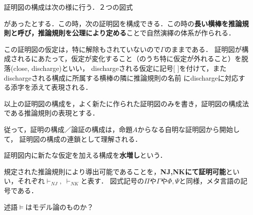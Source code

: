 \documentclass[uplatex, 12pt, dvipdfmx]{jsreport}
\begin{document}
\begin{definition}[証明図の構成（合成）]
    証明図の構成は次の様に行う．２つの図式
        \begin{center}
        \end{center}
        があったとする．この時，次の証明図を構成できる．この時の\textbf{長い横棒を推論規則と呼び，推論規則を公理により定める}ことで自然演繹の体系が作られる．
        \begin{center}
        \end{center}
        この証明図の仮定は，特に解除もされていないので$\Gamma$のままである．
        証明図が構成されるにあたって，仮定が変化すること（のうち特に仮定が外れること）を脱落(close, discharge)といい，
        dischargeされる仮定に記号[ ]を付けて，またdischargeされる構成に所属する横棒の隣に推論規則の名前
        にdischargeに対応する添字を添えて表現される．
    
        以上の証明図の構成を，よく新たに作られた証明図のみを書き，証明図の構成法である推論規則の表現とする．
\end{definition}

従って，証明の構成／論証の構成は，命題$A$からなる自明な証明図から開始して，
証明図の構成の連鎖として理解される．

\begin{definition}[weakening]
    証明図内に新たな仮定を加える構成を\textbf{水増し}という．
\end{definition}

\begin{definition}[証明可能性]
    規定された推論規則により導出可能であることを，\textbf{NJ,NKにて証明可能}といい，それぞれ$\vdash_{NJ},\;\vdash_{NK}$と表す．
    図式記号の$\Pi$や$\Gamma$や$\Phi,\Psi$と同様，メタ言語の記号である．
\end{definition}
\begin{remark}
    述語$\vDash$はモデル論のものか？
\end{remark}
\end{document}
